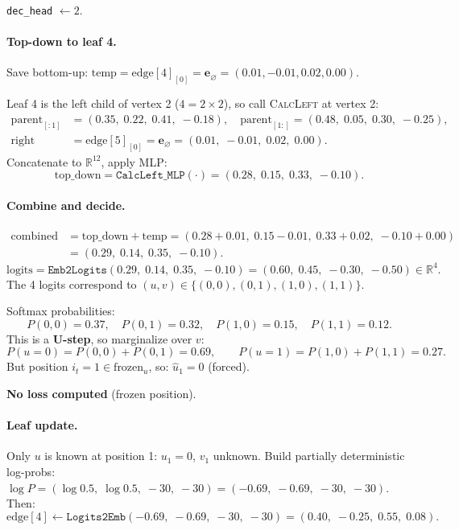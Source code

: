 \documentclass[11pt,a4paper]{article}
\newcommand{\R}{\mathbb{R}}
\newcommand{\noinf}{\mathbf{e}_{\varnothing}}
\newcommand{\calL}{\textsc{CalcLeft}}
\begin{document}
\texttt{dec\_head} $\leftarrow 2$.

\paragraph{Top-down to leaf 4.}
Save bottom-up: $\text{temp} = \text{edge}[4]_{[0]} = \noinf = (0.01, -0.01, 0.02, 0.00)$.

Leaf 4 is the left child of vertex 2 ($4 = 2 \times 2$), so call \calL{} at vertex 2:
\begin{align*}
\text{parent}_{[:1]} &= (0.35,\; 0.22,\; 0.41,\; -0.18), \quad
\text{parent}_{[1:]} = (0.48,\; 0.05,\; 0.30,\; -0.25), \\
\text{right} &= \text{edge}[5]_{[0]} = \noinf = (0.01,\; -0.01,\; 0.02,\; 0.00).
\end{align*}
Concatenate to $\R^{12}$, apply MLP:
\[
\text{top\_down} = \texttt{CalcLeft\_MLP}(\cdot) = (0.28,\; 0.15,\; 0.33,\; -0.10).
\]

\paragraph{Combine and decide.}
\begin{align*}
\text{combined} &= \text{top\_down} + \text{temp} = (0.28 + 0.01,\; 0.15 - 0.01,\; 0.33 + 0.02,\; -0.10 + 0.00) \\
&= (0.29,\; 0.14,\; 0.35,\; -0.10).
\end{align*}
\[
\text{logits} = \texttt{Emb2Logits}(0.29,\; 0.14,\; 0.35,\; -0.10) = (0.60,\; 0.45,\; -0.30,\; -0.50) \in \R^4.
\]
The 4 logits correspond to $(u,v) \in \{(0,0), (0,1), (1,0), (1,1)\}$.

Softmax probabilities:
\[
P(0,0) = 0.37, \quad P(0,1) = 0.32, \quad P(1,0) = 0.15, \quad P(1,1) = 0.12.
\]
This is a \textbf{U-step}, so marginalize over $v$:
\[
P(u{=}0) = P(0,0) + P(0,1) = 0.69, \qquad P(u{=}1) = P(1,0) + P(1,1) = 0.27.
\]
But position $i_t = 1 \in \text{frozen}_u$, so: $\hat{u}_1 = 0$ (forced).

\textbf{No loss computed} (frozen position).

\paragraph{Leaf update.}
Only $u$ is known at position 1: $u_1 = 0$, $v_1$ unknown.  Build partially deterministic log-probs: $\log P = (\log 0.5,\; \log 0.5,\; -30,\; -30) = (-0.69,\; -0.69,\; -30,\; -30)$.  Then:
\[
\text{edge}[4] \leftarrow \texttt{Logits2Emb}(-0.69,\; -0.69,\; -30,\; -30) = (0.40,\; -0.25,\; 0.55,\; 0.08).
\]
\end{document}
